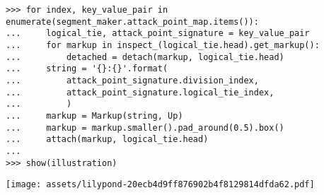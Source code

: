 \begin{comment}
<abjad>[stylesheet=../consort.ily]
for index, key_value_pair in enumerate(segment_maker.attack_point_map.items()):
    logical_tie, attack_point_signature = key_value_pair
    for markup in inspect_(logical_tie.head).get_markup():
        detached = detach(markup, logical_tie.head)
    string = '{}:{}'.format(
        attack_point_signature.division_index,
        attack_point_signature.logical_tie_index,
        )
    markup = Markup(string, Up)
    markup = markup.smaller().pad_around(0.5).box()
    attach(markup, logical_tie.head)

show(illustration)
</abjad>
\end{comment}

\begin{abjadbookoutput}
\begin{singlespacing}
\vspace{-0.5\baselineskip}
\begin{lstlisting}
>>> for index, key_value_pair in enumerate(segment_maker.attack_point_map.items()):
...     logical_tie, attack_point_signature = key_value_pair
...     for markup in inspect_(logical_tie.head).get_markup():
...         detached = detach(markup, logical_tie.head)
...     string = '{}:{}'.format(
...         attack_point_signature.division_index,
...         attack_point_signature.logical_tie_index,
...         )
...     markup = Markup(string, Up)
...     markup = markup.smaller().pad_around(0.5).box()
...     attach(markup, logical_tie.head)
...
>>> show(illustration)
\end{lstlisting}
\noindent\texttt{[image: assets/lilypond-20ecb4d9ff876902b4f8129814dfda62.pdf]}
\end{singlespacing}
\end{abjadbookoutput}

\begin{comment}
<abjad>[stylesheet=../consort.ily]
for index, key_value_pair in enumerate(segment_maker.attack_point_map.items()):
    logical_tie, attack_point_signature = key_value_pair
    for markup in inspect_(logical_tie.head).get_markup():
        detached = detach(markup, logical_tie.head)
    phrase_position = attack_point_signature.phrase_position
    markup = Markup.fraction(phrase_position)
    markup = Markup(markup, Up)
    markup = markup.smaller().pad_around(0.5).box()
    attach(markup, logical_tie.head)

show(illustration)
</abjad>
\end{comment}

